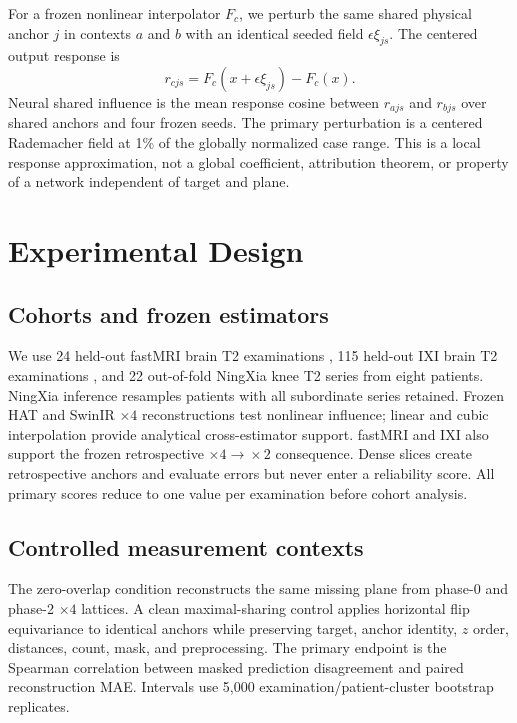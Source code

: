 \documentclass[10pt,twocolumn,letterpaper]{article}
\begin{document}
For a frozen nonlinear interpolator $F_c$, we perturb the same shared physical anchor $j$ in contexts $a$ and $b$ with an identical seeded field $\epsilon\xi_{js}$. The centered output response is
\begin{equation}
 r_{cjs}=F_c(x+\epsilon\xi_{js})-F_c(x).
\end{equation}
Neural shared influence is the mean response cosine between $r_{ajs}$ and $r_{bjs}$ over shared anchors and four frozen seeds. The primary perturbation is a centered Rademacher field at 1\% of the globally normalized case range. This is a local response approximation, not a global coefficient, attribution theorem, or property of a network independent of target and plane.

\section{Experimental Design}
\subsection{Cohorts and frozen estimators}
We use 24 held-out fastMRI brain T2 examinations \cite{knoll2020fastmri}, 115 held-out IXI brain T2 examinations \cite{ixi_dataset}, and 22 out-of-fold NingXia knee T2 series from eight patients. NingXia inference resamples patients with all subordinate series retained. Frozen HAT and SwinIR $\times4$ reconstructions test nonlinear influence; linear and cubic interpolation provide analytical cross-estimator support. fastMRI and IXI also support the frozen retrospective $\times4\!\rightarrow\!\times2$ consequence. Dense slices create retrospective anchors and evaluate errors but never enter a reliability score. All primary scores reduce to one value per examination before cohort analysis.

\subsection{Controlled measurement contexts}
The zero-overlap condition reconstructs the same missing plane from phase-0 and phase-2 $\times4$ lattices. A clean maximal-sharing control applies horizontal flip equivariance to identical anchors while preserving target, anchor identity, $z$ order, distances, count, mask, and preprocessing. The primary endpoint is the Spearman correlation between masked prediction disagreement and paired reconstruction MAE. Intervals use 5,000 examination/patient-cluster bootstrap replicates.
\end{document}
